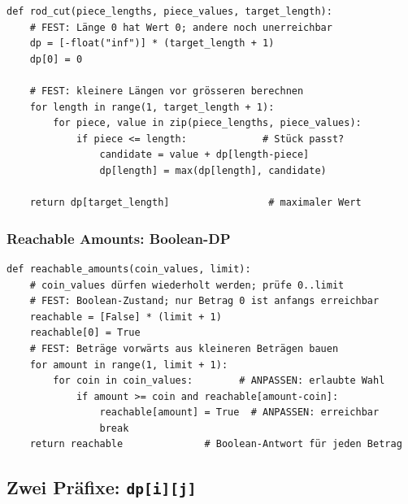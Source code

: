 \begin{codebox}
\begin{lstlisting}[style=CodeExpert]
def rod_cut(piece_lengths, piece_values, target_length):
    # FEST: Länge 0 hat Wert 0; andere noch unerreichbar
    dp = [-float("inf")] * (target_length + 1)
    dp[0] = 0

    # FEST: kleinere Längen vor grösseren berechnen
    for length in range(1, target_length + 1):
        for piece, value in zip(piece_lengths, piece_values):
            if piece <= length:             # Stück passt?
                candidate = value + dp[length-piece]
                dp[length] = max(dp[length], candidate)

    return dp[target_length]                 # maximaler Wert
\end{lstlisting}
\end{codebox}


\subsubsection{Reachable Amounts: Boolean-DP}\label{sec:03-reachable-amounts}

\begin{codebox}
\begin{lstlisting}[style=CodeExpert]
def reachable_amounts(coin_values, limit):
    # coin_values dürfen wiederholt werden; prüfe 0..limit
    # FEST: Boolean-Zustand; nur Betrag 0 ist anfangs erreichbar
    reachable = [False] * (limit + 1)
    reachable[0] = True
    # FEST: Beträge vorwärts aus kleineren Beträgen bauen
    for amount in range(1, limit + 1):
        for coin in coin_values:        # ANPASSEN: erlaubte Wahl
            if amount >= coin and reachable[amount-coin]:
                reachable[amount] = True  # ANPASSEN: erreichbar
                break
    return reachable              # Boolean-Antwort für jeden Betrag
\end{lstlisting}
\end{codebox}


\subsection{Zwei Präfixe: \texttt{dp[i][j]}}\label{sec:03-zwei-praefixe}

